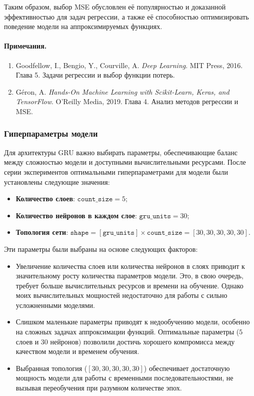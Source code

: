 Таким образом, выбор MSE обусловлен её популярностью и доказанной эффективностью для задач регрессии, а также её способностью оптимизировать поведение модели на аппроксимируемых функциях.

\paragraph{Примечания.}
\begin{enumerate}
    \item Goodfellow, I., Bengio, Y., Courville, A. \textit{Deep Learning}. MIT Press, 2016. Глава 5. Задачи регрессии и выбор функции потерь.
    \item Géron, A. \textit{Hands-On Machine Learning with Scikit-Learn, Keras, and TensorFlow}. O'Reilly Media, 2019. Глава 4. Анализ методов регрессии и MSE.
\end{enumerate}


\subsubsection{Гиперпараметры модели}

Для архитектуры GRU важно выбирать параметры, обеспечивающие баланс между сложностью модели и доступными вычислительными ресурсами. После серии экспериментов оптимальными гиперпараметрами для модели были установлены следующие значения:
\begin{itemize}
    \item \textbf{Количество слоев}: \( \texttt{count\_size} = 5 \);
    \item \textbf{Количество нейронов в каждом слое}: \( \texttt{gru\_units} = 30 \);
    \item \textbf{Топология сети}: \( \texttt{shape} = [\texttt{gru\_units}] \times \texttt{count\_size} = [30, 30, 30, 30, 30] \).
\end{itemize}

Эти параметры были выбраны на основе следующих факторов:
\begin{itemize}
    \item Увеличение количества слоев или количества нейронов в слоях приводит к значительному росту количества параметров модели. Это, в свою очередь, требует больше вычислительных ресурсов и времени на обучение. Однако моих вычислительных мощностей недостаточно для работы с сильно усложненными моделями.
    \item Слишком маленькие параметры приводят к недообучению модели, особенно на сложных задачах аппроксимации функций. Оптимальные параметры (\( 5 \) слоев и \( 30 \) нейронов) позволили достичь хорошего компромисса между качеством модели и временем обучения.
    \item Выбранная топология (\( [30, 30, 30, 30, 30] \)) обеспечивает достаточную мощность модели для работы с временными последовательностями, не вызывая переобучения при разумном количестве эпох.
\end{itemize}

